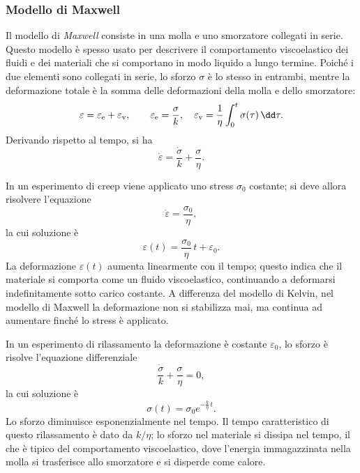 \subsubsection{Modello di Maxwell}
Il modello di \textit{Maxwell} consiste in una molla e uno smorzatore collegati in serie. Questo modello è spesso usato per descrivere il comportamento viscoelastico dei fluidi e dei materiali che si comportano in modo liquido a lungo termine. Poiché i due elementi sono collegati in serie, lo sforzo $\sigma$ è lo stesso in entrambi, mentre la deformazione totale è la somma delle deformazioni della molla e dello smorzatore:
\begin{equation}
\varepsilon=\varepsilon_{\rm e}+\varepsilon_{\rm v}, \qquad \varepsilon_{\rm e}=\frac{\sigma}{k}, \quad \varepsilon_{\rm v}=\frac{1}{\eta}\int_0^t\sigma(\tau)\,\dd \tau.
\end{equation}
Derivando rispetto al tempo, si ha
\begin{equation}
\dot{\varepsilon}=\frac{\dot \sigma}{k}+\frac{\sigma}{\eta}.
\end{equation}

In un esperimento di creep viene applicato uno stress $\sigma_0$ costante; si deve allora risolvere l'equazione 
\begin{equation}
	\dot{\varepsilon}=\frac{\sigma_0}{\eta},
\end{equation}
la cui soluzione è
\begin{equation}
\varepsilon(t)=\frac{\sigma_0}{\eta}\,t+\varepsilon_0.
\end{equation}
La deformazione $\varepsilon(t)$ aumenta linearmente con il tempo; questo indica che il materiale si comporta come un fluido viscoelastico, continuando a deformarsi indefinitamente sotto carico costante. A differenza del modello di Kelvin, nel modello di Maxwell la deformazione non si stabilizza mai, ma continua ad aumentare finché lo stress è applicato.

In un esperimento di rilassamento la deformazione è costante $\varepsilon_0$, lo sforzo è risolve l'equazione differenziale
\begin{equation}
	\frac{\dot \sigma}{k}+\frac{\sigma}{\eta}=0,
\end{equation}
la cui soluzione è
\begin{equation}
	\sigma(t)=\sigma_0e^{-\frac{k}{\eta}\,t}.
\end{equation}
Lo sforzo diminuisce esponenzialmente nel tempo. Il tempo caratteristico di questo rilassamento è dato da $k/\eta$; lo sforzo nel materiale si dissipa nel tempo, il che è tipico del comportamento viscoelastico, dove l'energia immagazzinata nella molla si trasferisce allo smorzatore e si disperde come calore.

